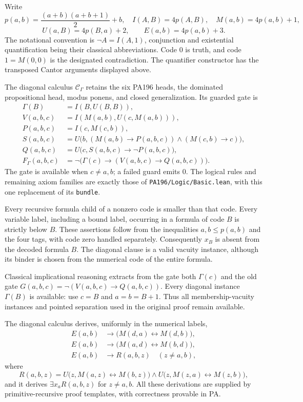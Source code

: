 Write
\[
 p(a,b)=\frac{(a+b)(a+b+1)}2+b,
 \quad I(A,B)=4p(A,B),\quad M(a,b)=4p(a,b)+1,
\]
\[
 U(a,B)=4p(B,a)+2,\qquad E(a,b)=4p(a,b)+3.
\]
The notational convention is $\neg A=I(A,1)$, conjunction and existential
quantification being their classical abbreviations. Code $0$ is truth,
and code $1=M(0,0)$ is the designated contradiction. The quantifier
constructor has the transposed Cantor arguments displayed above.

The diagonal calculus $\mathcal C_\Gamma$ retains the six PA196 heads,
the dominated propositional head, modus ponens, and closed
generalization. Its guarded gate is
\begin{align*}
 \Gamma(B)&=I(B,U(B,B)),\\
 V(a,b,c)&=I(M(a,b),U(c,M(a,b))),\\
 P(a,b,c)&=I(c,M(c,b)),\\
 S(a,b,c)&=U\bigl(b,
       (M(a,b)\to P(a,b,c))\wedge(M(c,b)\to c)\bigr),\\
 Q(a,b,c)&=U\bigl(c,S(a,b,c)\to\neg P(a,b,c)\bigr),\\
 F_\Gamma(a,b,c)&=\neg\bigl(\Gamma(c)\to(V(a,b,c)\to Q(a,b,c))\bigr).
\end{align*}
The gate is available when $c\ne a,b$; a failed guard emits $0$.
The logical rules and remaining axiom families are exactly those of
\texttt{PA196/Logic/Basic.lean}, with this one replacement of its
\texttt{bundle}.

Every recursive formula child of a nonzero code is smaller than that
code. Every variable label, including a bound label, occurring in a
formula of code $B$ is strictly below $B$. These assertions follow from
the inequalities $a,b\le p(a,b)$ and the four tags, with code zero handled
separately. Consequently $x_B$ is absent from the decoded formula $B$.
The diagonal clause is a valid vacuity instance, although its binder is
chosen from the numerical code of the entire formula.

Classical implicational reasoning extracts from the gate both
$\Gamma(c)$ and the old gate $G(a,b,c)=\neg(V(a,b,c)\to Q(a,b,c))$.
Every diagonal instance $\Gamma(B)$ is available: use $c=B$ and
$a=b=B+1$. Thus all membership-vacuity instances and pointed separation
used in the original proof remain available.

\begin{lemma}
\label{lem:pa-diagonal-interfaces}
The diagonal calculus derives, uniformly in the numerical labels,
\begin{align*}
 E(a,b)&\to\bigl(M(d,a)\leftrightarrow M(d,b)\bigr),\\
 E(a,b)&\to\bigl(M(a,d)\leftrightarrow M(b,d)\bigr),\\
 E(a,b)&\to R(a,b,z)\quad (z\ne a,b),
\end{align*}
where
\[
 R(a,b,z)=U\bigl(z,M(a,z)\leftrightarrow M(b,z)\bigr)
 \wedge U\bigl(z,M(z,a)\leftrightarrow M(z,b)\bigr),
\]
and it derives $\exists x_a R(a,b,z)$ for $z\ne a,b$.
All these derivations are supplied by primitive-recursive proof templates,
with correctness provable in PA.
\end{lemma}

